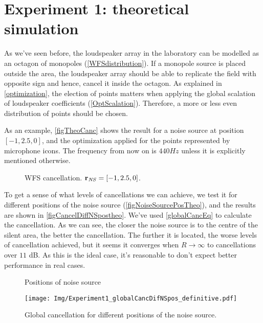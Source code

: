 \section{Experiment 1: theoretical simulation}
As we've seen before, the loudspeaker array in the laboratory can be modelled as an octagon of monopoles (\autoref{WFSdistribution}). If a monopole source is placed outside the area, the loudspeaker array should be able to replicate the field with opposite sign and hence, cancel it inside the octagon. As explained in \autoref{optimization}, the election of points matters when applying the global scalation of loudspeaker coefficients (\autoref{OptScalation}). Therefore, a more or less even distribution of points should be chosen.

As an example, \autoref{figTheoCanc} shows the result for a noise source at position $[-1, 2.5, 0]$, and the optimization applied for the points represented by microphone icons. The frequency from now on is $440\si{Hz}$ unless it is explicitly mentioned otherwise.

\begin{figure}[H]
	\centering
	\caption[WFS cancellation]{WFS cancellation. $\pos[vecNS]{} = [-1, 2.5, 0]$.}
	\label{figTheoCanc}
\end{figure}

To get a sense of what levels of cancellations we can achieve, we test it for different positions of the noise source (\autoref{figNoiseSourcePosTheo}), and the results are shown in \autoref{figCancelDiffNSpostheo}. We've used \autoref{globalCancEq} to calculate the cancellation. As we can see, the closer the noise source is to the centre of the silent area, the better the cancellation. The further it is located, the worse levels of cancellation achieved, but it seems it converges when $R\rightarrow\infty$ to cancellations over $11$ dB. As this is the ideal case, it's reasonable to don't expect better performance in real cases.

\begin{figure}[h]
	\centering
	\begin{minipage}[b]{0.49\textwidth}
			\centering
			\def\svgwidth{\columnwidth}
			\graphicspath{{Img/}}
			
			\caption[Positions of noise source]{Positions of noise source}
			\label{figNoiseSourcePosTheo}
	\end{minipage}
	\begin{minipage}[b]{0.49\textwidth}
			\centering
		\texttt{[image: Img/Experiment1\_globalCancDifNSpos\_definitive.pdf]}
		\caption[Global cancellation. Theoretical model.]{Global cancellation for different positions of the noise source.}
		\label{figCancelDiffNSpostheo}
	\end{minipage}
\end{figure}

